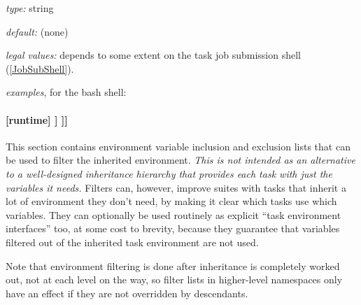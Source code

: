 \begin{myitemize}
\item {\em type:} string
\item {\em default:} (none)
\item {\em legal values:} depends to some extent on the task job
    submission shell (\ref{JobSubShell}).
\item {\em examples}, for the bash shell:
\end{myitemize}

\paragraph[{[[[}environment filter{]]]}]{ [runtime] \textrightarrow [[\_\_NAME\_\_]] \textrightarrow [[[environment filter]]]}
\label{EnvironmentFilter}

This section contains environment variable inclusion and exclusion
lists that can be used to filter the inherited environment. {\em This is
not intended as an alternative to a well-designed inheritance hierarchy
that provides each task with just the variables it needs.} Filters can,
however, improve suites with tasks that inherit a lot of environment
they don't need, by making it clear which tasks use which variables.
They can optionally be used routinely as explicit ``task environment
interfaces'' too, at some cost to brevity, because they guarantee that
variables filtered out of the inherited task environment are not used.

Note that environment filtering is done after inheritance is completely
worked out, not at each level on the way, so filter lists in higher-level
namespaces only have an effect if they are not overridden by descendants.

